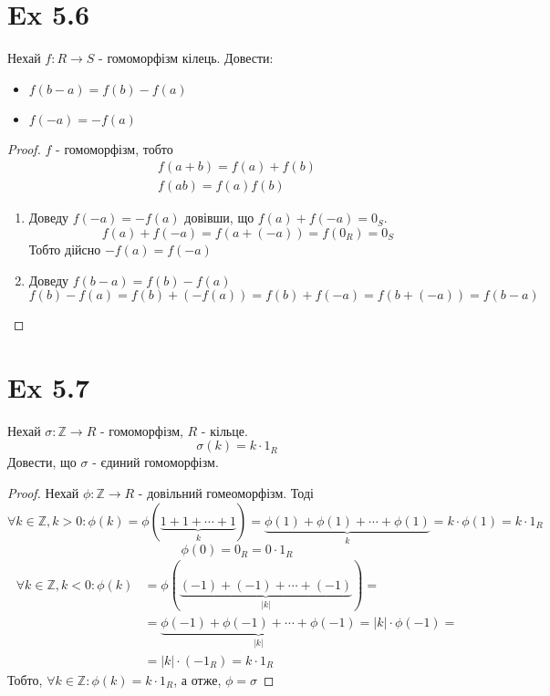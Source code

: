 \documentclass[11pt, a4paper]{article} %
\newcommand{\Z}{\mathbb{Z}}
\begin{document}
\section*{Ex 5.6}
\begin{mdframed}
    Нехай $f: R\to S$ - гомоморфізм кілець.
    Довести:
    \begin{itemize}
        \item $f(b-a) = f(b)-f(a)$
        \item $f(-a) = -f(a)$
    \end{itemize}
\end{mdframed}

\begin{proof}
    $f$ - гомоморфізм, тобто
    \begin{gather*}
        f(a+b) = f(a)+f(b)\\
        f(ab) = f(a)f(b)
    \end{gather*}

    \begin{enumerate}
        \item Доведу $f(-a) = -f(a)$ довівши, що $f(a) + f(-a) = 0_S$.
        \[f(a) + f(-a) = f(a+(-a)) = f(0_R) = 0_S\]
        Тобто дійсно $-f(a) = f(-a)$
        
        \item Доведу $f(b-a) = f(b)-f(a)$\\
        \[f(b)-f(a) = f(b)+(-f(a)) = f(b) + f(-a) = f(b+(-a)) = f(b-a)\]
    \end{enumerate}
 
\end{proof}


\section*{Ex 5.7}\label{ex5.7}
\begin{mdframed}
    Нехай $\sigma: \Z \to R$ - гомоморфізм, $R$ - кільце.
    \[\sigma(k) = k\cdot 1_R\]
    Довести, що $\sigma$ - єдиний гомоморфізм.
\end{mdframed}

\begin{proof}
    Нехай $\phi: \Z \to R$ - довільний гомеоморфізм.
    Тоді
    \[\forall k\in\Z, k>0: \phi(k) = \phi(\underbrace{1+1+\cdots+1}_k) = \underbrace{\phi(1) + \phi(1) + \cdots + \phi(1)}_k 
    = k \cdot \phi(1) = k \cdot 1_R\]
    \[\phi(0) = 0_R = 0\cdot 1_R\]
    \begin{align*}
        \forall k\in\Z, k<0: \phi(k) &= \phi(\underbrace{(-1)+(-1)+\cdots+(-1)}_{|k|}) = \\
        &= \underbrace{\phi(-1) + \phi(-1) + \cdots + \phi(-1)}_{|k|} = |k| \cdot \phi(-1) = \\
        &= |k| \cdot (-1_R) = k \cdot 1_R
    \end{align*}
    Тобто, $\forall k\in\Z: \phi(k) = k\cdot 1_R$, а отже, $\phi = \sigma$
\end{proof}
\end{document}
